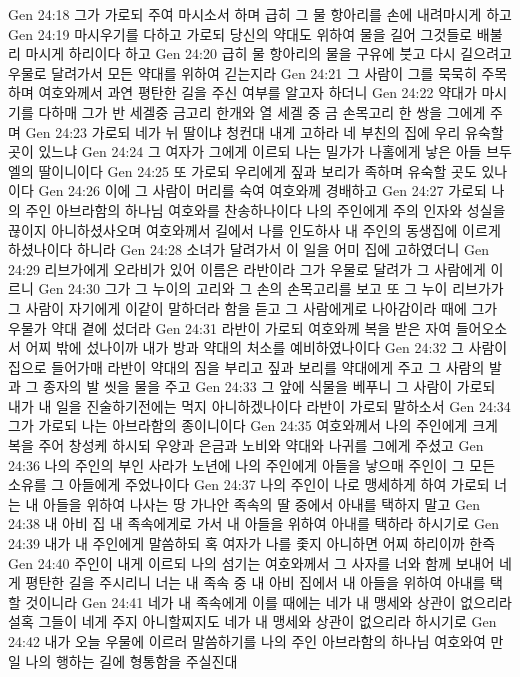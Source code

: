 Gen 24:18  그가 가로되 주여 마시소서 하며 급히 그 물 항아리를 손에 내려마시게 하고
Gen 24:19  마시우기를 다하고 가로되 당신의 약대도 위하여 물을 길어 그것들로 배불리 마시게 하리이다 하고
Gen 24:20  급히 물 항아리의 물을 구유에 붓고 다시 길으려고 우물로 달려가서 모든 약대를 위하여 긷는지라
Gen 24:21  그 사람이 그를 묵묵히 주목하며 여호와께서 과연 평탄한 길을 주신 여부를 알고자 하더니
Gen 24:22  약대가 마시기를 다하매 그가 반 세겔중 금고리 한개와 열 세겔 중 금 손목고리 한 쌍을 그에게 주며
Gen 24:23  가로되 네가 뉘 딸이냐 청컨대 내게 고하라 네 부친의 집에 우리 유숙할 곳이 있느냐
Gen 24:24  그 여자가 그에게 이르되 나는 밀가가 나홀에게 낳은 아들 브두엘의 딸이니이다
Gen 24:25  또 가로되 우리에게 짚과 보리가 족하며 유숙할 곳도 있나이다
Gen 24:26  이에 그 사람이 머리를 숙여 여호와께 경배하고
Gen 24:27  가로되 나의 주인 아브라함의 하나님 여호와를 찬송하나이다 나의 주인에게 주의 인자와 성실을 끊이지 아니하셨사오며 여호와께서 길에서 나를 인도하사 내 주인의 동생집에 이르게 하셨나이다 하니라
Gen 24:28  소녀가 달려가서 이 일을 어미 집에 고하였더니
Gen 24:29  리브가에게 오라비가 있어 이름은 라반이라 그가 우물로 달려가 그 사람에게 이르니
Gen 24:30  그가 그 누이의 고리와 그 손의 손목고리를 보고 또 그 누이 리브가가 그 사람이 자기에게 이같이 말하더라 함을 듣고 그 사람에게로 나아감이라 때에 그가 우물가 약대 곁에 섰더라
Gen 24:31  라반이 가로되 여호와께 복을 받은 자여 들어오소서 어찌 밖에 섰나이까 내가 방과 약대의 처소를 예비하였나이다
Gen 24:32  그 사람이 집으로 들어가매 라반이 약대의 짐을 부리고 짚과 보리를 약대에게 주고 그 사람의 발과 그 종자의 발 씻을 물을 주고
Gen 24:33  그 앞에 식물을 베푸니 그 사람이 가로되 내가 내 일을 진술하기전에는 먹지 아니하겠나이다 라반이 가로되 말하소서
Gen 24:34  그가 가로되 나는 아브라함의 종이니이다
Gen 24:35  여호와께서 나의 주인에게 크게 복을 주어 창성케 하시되 우양과 은금과 노비와 약대와 나귀를 그에게 주셨고
Gen 24:36  나의 주인의 부인 사라가 노년에 나의 주인에게 아들을 낳으매 주인이 그 모든 소유를 그 아들에게 주었나이다
Gen 24:37  나의 주인이 나로 맹세하게 하여 가로되 너는 내 아들을 위하여 나사는 땅 가나안 족속의 딸 중에서 아내를 택하지 말고
Gen 24:38  내 아비 집 내 족속에게로 가서 내 아들을 위하여 아내를 택하라 하시기로
Gen 24:39  내가 내 주인에게 말씀하되 혹 여자가 나를 좇지 아니하면 어찌 하리이까 한즉
Gen 24:40  주인이 내게 이르되 나의 섬기는 여호와께서 그 사자를 너와 함께 보내어 네게 평탄한 길을 주시리니 너는 내 족속 중 내 아비 집에서 내 아들을 위하여 아내를 택할 것이니라
Gen 24:41  네가 내 족속에게 이를 때에는 네가 내 맹세와 상관이 없으리라 설혹 그들이 네게 주지 아니할찌지도 네가 내 맹세와 상관이 없으리라 하시기로
Gen 24:42  내가 오늘 우물에 이르러 말씀하기를 나의 주인 아브라함의 하나님 여호와여 만일 나의 행하는 길에 형통함을 주실진대
